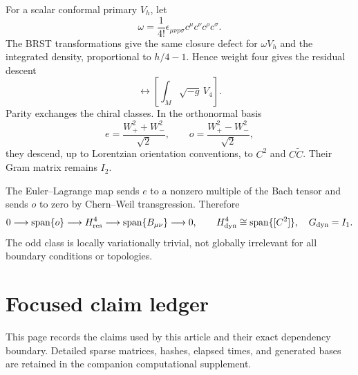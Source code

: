 \documentclass[11pt]{article}
\theoremstyle{remark}
\begin{document}
For a scalar conformal primary $V_h$, let
\begin{equation}
 \omega=\frac1{4!}\epsilon_{\mu\nu\rho\sigma}
 c^\mu c^\nu c^\rho c^\sigma.
\end{equation}
The BRST transformations give the same closure defect for $\omega V_h$ and
the integrated density, proportional to $h/4-1$.  Hence weight four gives
the residual descent
\begin{equation}
 [\omega V_4]\longleftrightarrow
 \left[\int_M\sqrt{-g}\,V_4\right].
\end{equation}
Parity exchanges the chiral classes.  In the orthonormal basis
\begin{equation}\label{eq:parity-a}
 e=\frac{W_+^2+W_-^2}{\sqrt2},
 \qquad o=\frac{W_+^2-W_-^2}{\sqrt2},
\end{equation}
they descend, up to Lorentzian orientation conventions, to $C^2$ and
$C\widetilde C$.  Their Gram matrix remains $I_2$.

The Euler--Lagrange map sends $e$ to a nonzero multiple of the Bach tensor
and sends $o$ to zero by Chern--Weil transgression.  Therefore
\begin{equation}\label{eq:dynamical-a}
 0\longrightarrow\operatorname{span}\{o\}
 \longrightarrow H^4_{\rm res}
 \longrightarrow\operatorname{span}\{B_{\mu\nu}\}
 \longrightarrow0,
 \qquad
 H^4_{\rm dyn}\cong\operatorname{span}\{[C^2]\},
 \quad G_{\rm dyn}=I_1.
\end{equation}
The odd class is locally variationally trivial, not globally irrelevant for
all boundary conditions or topologies.

\clearpage
\section{Focused claim ledger}\label{sec:ledger}

This page records the claims used by this article and their exact
dependency boundary.  Detailed sparse matrices, hashes, elapsed times, and
generated bases are retained in the companion computational supplement.
\end{document}
